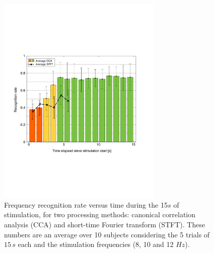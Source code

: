 \documentclass[smallextended]{svjour3}
\begin{document}
\begin{figure}
\center
\includegraphics[width=0.7\textwidth]{figures/all_time_reconn.pdf}
\caption{Frequency recognition rate versus time during the 15$s$ of stimulation, for two processing methods: canonical correlation analysis (CCA) and short-time Fourier transform (STFT). These numbers are an average over 10 subjects considering the 5 trials of $15\,s$ each and the stimulation frequencies (8, 10 and 12 $Hz$).} \label{fig:all_time_reconn}
\end{figure}
\end{document}
